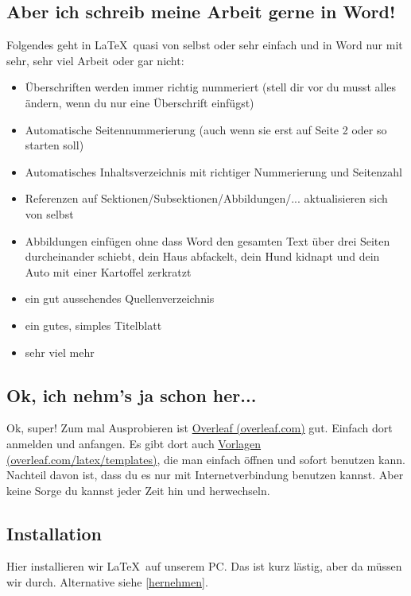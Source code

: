 \documentclass[titlepage]{article}
\begin{document}
\subsection{Aber ich schreib meine Arbeit gerne in Word!}

Folgendes geht in \LaTeX\ quasi von selbst oder sehr einfach und in Word nur mit sehr, sehr viel Arbeit oder gar nicht:
\begin{itemize}
	\item Überschriften werden immer richtig nummeriert (stell dir vor du musst alles ändern, wenn du nur eine Überschrift einfügst)
	\item Automatische Seitennummerierung (auch wenn sie erst auf Seite 2 oder so starten soll)
	\item Automatisches Inhaltsverzeichnis mit richtiger Nummerierung und Seitenzahl
	\item Referenzen auf Sektionen/Subsektionen/Abbildungen/... aktualisieren sich von selbst
	\item Abbildungen einfügen ohne dass Word den gesamten Text über drei Seiten durcheinander schiebt, dein Haus abfackelt, dein Hund kidnapt und dein Auto mit einer Kartoffel zerkratzt
	\item ein gut aussehendes Quellenverzeichnis
	\item ein gutes, simples Titelblatt
	\item sehr viel mehr
\end{itemize}

\subsection{Ok, ich nehm's ja schon her...} \label{hernehmen}

Ok, super!
Zum mal Ausprobieren ist \href{https://www.overleaf.com/}{Overleaf (overleaf.com)} gut.
Einfach dort anmelden und anfangen.
Es gibt dort auch \href{https://www.overleaf.com/latex/templates}{Vorlagen (overleaf.com/latex/templates)}, die man einfach öffnen und sofort benutzen kann. \\

Nachteil davon ist, dass du es nur mit Internetverbindung benutzen kannst.
Aber keine Sorge du kannst jeder Zeit hin und herwechseln.

\subsection{Installation} \label{Installation}

Hier installieren wir \LaTeX\ auf unserem PC.
Das ist kurz lästig, aber da müssen wir durch. Alternative siehe \autoref{hernehmen}.
\end{document}
